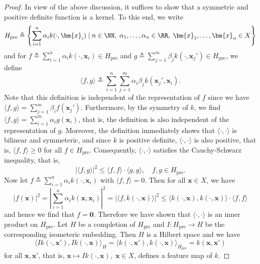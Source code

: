 \begin{proof}
    In view of the above discussion, it suffices to show that a symmetric and positive definite function is a kernel. To this end, we write
    \begin{equation*}
        H_{\text{pre}} \triangleq \left\{ \sum_{i=1}^{n} \alpha_{i} k (\cdot , \bm{x}_{i}) \mid n \in \NN , \; \alpha_1 , \ldots , \alpha_n \in \RR , \; \bm{x}_{1} , \ldots , \bm{x}_{n} \in X \right\}
    \end{equation*}
    and for $f \triangleq \sum_{i=1}^{n} \alpha_{i} k (\cdot , \bm{x}_{i}) \in H_{\text{pre}}$ and $g \triangleq \sum_{j=1}^{m} \beta_{j} k (\cdot , \bm{x}_{j}') \in H_{\text{pre}}$, we define
    \begin{equation*}
        \langle f,g \rangle \triangleq \sum_{i=1}^{n} \sum_{j=1}^{m} \alpha_{i} \beta_{j} k (\bm{x}_{j}' , \bm{x}_{i}).
    \end{equation*}
    Note that this definition is independent of the representation of $f$ since we have $\langle f,g \rangle = \sum_{j=1}^{m} \beta_{i}  f (\bm{x}_{j}')$. Furthermore, by the symmetry of $k$, we find $\langle f,g \rangle = \sum_{i=1}^{m} \alpha_{i}  g (\bm{x}_{i})$, that is, the definition is also independent of the representation of $g$. Moreover, the definition immediately shows that $\langle \cdot , \cdot \rangle$ is bilinear and symmeteric, and since $k$ is positive definite, $\langle \cdot , \cdot \rangle$ is also positive, that is, $\langle f , f \rangle \geq 0$ for all $f \in H_{\text{pre}}$. Consequently, $\langle \cdot , \cdot \rangle$ satisfies the Cauchy-Schwarz inequality, that is,
    \begin{equation*}
        \left| \langle f,g \rangle \right|^2 \leq \langle f , f \rangle \cdot \langle g , g \rangle, \quad f,g \in H_{\text{pre}}.
    \end{equation*}
    Now let $f \triangleq \sum_{i=1}^{n} \alpha_{i} k (\cdot , \bm{x}_{i})$ with $\langle f , f \rangle = 0$. Then for all $\bm{x} \in X$, we have
    \begin{equation*}
        \left| f(\bm{x}) \right|^2 = \left| \sum_{i=1}^{n} \alpha_i k (\bm{x} , \bm{x}_i) \right|^2 = \left| \langle f , k (\cdot , \bm{x}) \rangle \right|^2 \leq  \langle k (\cdot , \bm{x}) , k (\cdot , \bm{x}) \rangle \cdot \langle f , f \rangle
    \end{equation*}
    and hence we find that $f = \bm{0}$. Therefore we have shown that $\langle \cdot , \cdot \rangle$ is an inner product on $H_{\text{pre}}$. Let $H$ be a completion of $H_{\text{pre}}$ and $I : H_{\text{pre}} \to H$ be the corresponding isometeric embedding. Then $H$ is a Hilbert space and we have
    \begin{equation*}
        \langle I k (\cdot , \bm{x}') , I k (\cdot , \bm{x}) \rangle_{H} = \langle k (\cdot , \bm{x}') , k (\cdot , \bm{x}) \rangle_{H_{\text{pre}}} = k (\bm{x} , \bm{x}')
    \end{equation*}
    for all $\bm{x} , \bm{x}'$, that is, $\bm{x} \mapsto I k (\cdot , \bm{x}), \; \bm{x} \in X$, defines a feature map of $k$.
\end{proof}